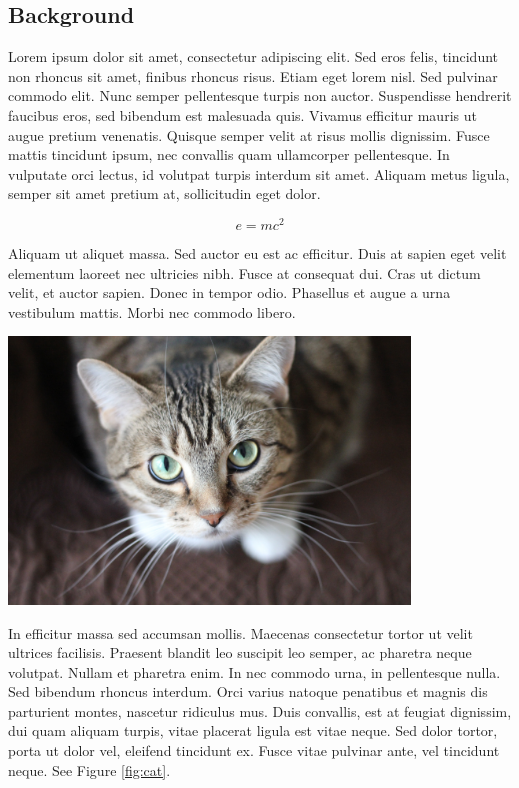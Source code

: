\documentclass{OP-Whitepaper}
\begin{document}
\maketitle


\begin{multicols}{3}

\section{Background}

Lorem ipsum dolor sit amet, consectetur adipiscing elit. Sed eros felis, tincidunt non rhoncus sit amet, finibus rhoncus risus. Etiam eget lorem nisl. Sed pulvinar commodo elit. Nunc semper pellentesque turpis non auctor. Suspendisse hendrerit faucibus eros, sed bibendum est malesuada quis. Vivamus efficitur mauris ut augue pretium venenatis. Quisque semper velit at risus mollis dignissim. Fusce mattis tincidunt ipsum, nec convallis quam ullamcorper pellentesque. In vulputate orci lectus, id volutpat turpis interdum sit amet. Aliquam metus ligula, semper sit amet pretium at, sollicitudin eget dolor.

$$
e = mc^2
$$

Aliquam ut aliquet massa. Sed auctor eu est ac efficitur. Duis at sapien eget velit elementum laoreet nec ultricies nibh. Fusce at consequat dui. Cras ut dictum velit, et auctor sapien. Donec in tempor odio. Phasellus et augue a urna vestibulum mattis. Morbi nec commodo libero.

\begin{Figure}
    \centering
    \label{fig:cat}
    \includegraphics[width=0.8\textwidth]{cat.jpg}
\end{Figure}

In efficitur massa sed accumsan mollis. Maecenas consectetur tortor ut velit ultrices facilisis. Praesent blandit leo suscipit leo semper, ac pharetra neque volutpat. Nullam et pharetra enim. In nec commodo urna, in pellentesque nulla. Sed bibendum rhoncus interdum. Orci varius natoque penatibus et magnis dis parturient montes, nascetur ridiculus mus. Duis convallis, est at feugiat dignissim, dui quam aliquam turpis, vitae placerat ligula est vitae neque. Sed dolor tortor, porta ut dolor vel, eleifend tincidunt ex. Fusce vitae pulvinar ante, vel tincidunt neque. See Figure \ref{fig:cat}.


\end{multicols}
\end{document}

